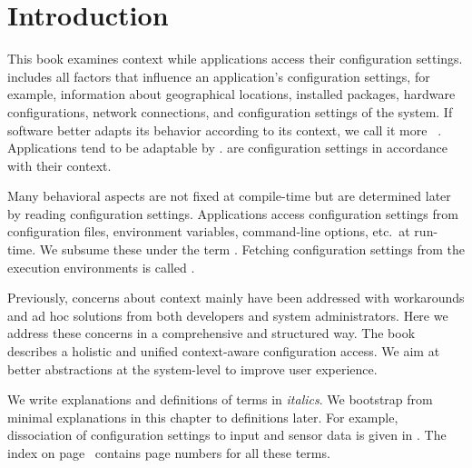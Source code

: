\chapter{Introduction}
\label{chapter:introduction}


\chapterhung

This book examines context while applications access their configuration settings.
 includes all factors that influence an application's configuration settings, for example, information about geographical locations, installed packages, hardware configurations, network connections, and configuration settings of the system.
If software better adapts its behavior according to its context, we call it more ~\cite{alegre2016engineering}.
Applications tend to be adaptable by .
 are configuration settings in accordance with their context.

Many behavioral aspects are not fixed at compile-time but are determined later by reading configuration settings.
Applications access configuration settings from configuration files, environment variables, command-line options, etc.\ at run-time.
We subsume these  under the term .
Fetching configuration settings from the execution environments is called .

Previously, concerns about context mainly have been addressed with workarounds and ad hoc solutions from both developers and system administrators.
Here we address these concerns in a comprehensive and structured way.
The book describes a holistic and unified context-aware configuration access.
We aim at better abstractions at the system-level to improve user experience.

We write explanations and definitions of terms in \emph{italics}.
We bootstrap from minimal explanations in this chapter to definitions later.
For example, dissociation of configuration settings to input and sensor data is given in . %
The index on page~\pageref{index} contains page numbers for all these terms.

